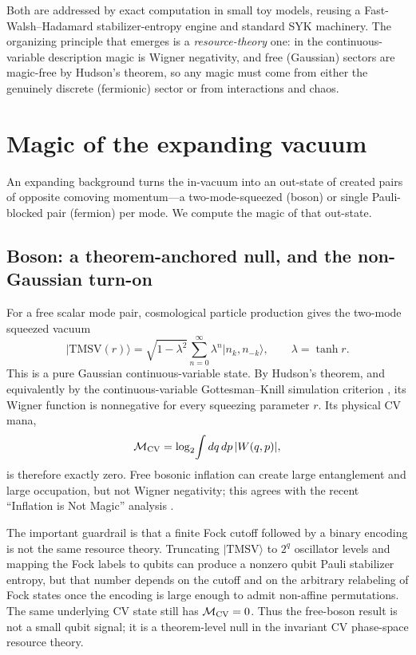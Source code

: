 \documentclass[11pt]{article}
\newcommand{\ket}[1]{\lvert #1 \rangle}
\begin{document}
Both are addressed by exact computation in small toy models, reusing a
Fast-Walsh--Hadamard stabilizer-entropy engine and standard SYK machinery.
The organizing principle that emerges is a \emph{resource-theory} one: in the
continuous-variable description magic is Wigner negativity, and free
(Gaussian) sectors are magic-free by Hudson's theorem, so any magic must come
from either the genuinely discrete (fermionic) sector or from interactions
and chaos.

\section{Magic of the expanding vacuum}
\label{sec:p1}

An expanding background turns the in-vacuum into an out-state of created
pairs of opposite comoving momentum---a two-mode-squeezed (boson) or single
Pauli-blocked pair (fermion) per mode. We compute the magic of that
out-state.

\subsection{Boson: a theorem-anchored null, and the non-Gaussian turn-on}
For a free scalar mode pair, cosmological particle production gives the
two-mode squeezed vacuum
\begin{equation}
  \ket{\mathrm{TMSV}(r)}
  = \sqrt{1-\lambda^2}\sum_{n=0}^{\infty}\lambda^n
    \ket{n_k,n_{-k}},\qquad \lambda=\tanh r .
\end{equation}
This is a pure Gaussian continuous-variable state. By Hudson's theorem, and
equivalently by the continuous-variable Gottesman--Knill simulation criterion
\citep{hudson,mari_eisert}, its Wigner function is nonnegative for every
squeezing parameter $r$. Its physical CV mana,
\begin{equation}
  \mathcal{M}_{\rm CV}=\log_2\!\int dq\,dp\, |W(q,p)| ,
\end{equation}
is therefore exactly zero. Free bosonic inflation can create large
entanglement and large occupation, but not Wigner negativity; this agrees with
the recent ``Inflation is Not Magic'' analysis \citep{inflation_not_magic}.

The important guardrail is that a finite Fock cutoff followed by a binary
encoding is not the same resource theory. Truncating
$\ket{\mathrm{TMSV}}$ to $2^q$ oscillator levels and mapping the Fock labels
to qubits can produce a nonzero qubit Pauli stabilizer entropy, but that
number depends on the cutoff and on the arbitrary relabeling of Fock states
once the encoding is large enough to admit non-affine permutations. The same
underlying CV state still has $\mathcal{M}_{\rm CV}=0$. Thus the free-boson
result is not a small qubit signal; it is a theorem-level null in the
invariant CV phase-space resource theory.
\end{document}
